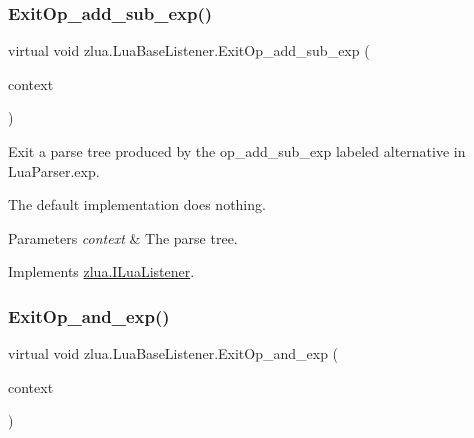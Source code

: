 \subsubsection{\texorpdfstring{Exit\+Op\+\_\+add\+\_\+sub\+\_\+exp()}{ExitOp\_add\_sub\_exp()}}
{\footnotesize\ttfamily virtual void zlua.\+Lua\+Base\+Listener.\+Exit\+Op\+\_\+add\+\_\+sub\+\_\+exp (\begin{DoxyParamCaption}\item[{\mbox{[}\+Not\+Null\mbox{]} \mbox{\hyperlink{classzlua_1_1_lua_parser_1_1_op__add__sub__exp_context}{Lua\+Parser.\+Op\+\_\+add\+\_\+sub\+\_\+exp\+Context}}}]{context }\end{DoxyParamCaption})\hspace{0.3cm}{\ttfamily [virtual]}}



Exit a parse tree produced by the {\ttfamily op\+\_\+add\+\_\+sub\+\_\+exp} labeled alternative in Lua\+Parser.\+exp. 

The default implementation does nothing.


\begin{DoxyParams}{Parameters}
{\em context} & The parse tree.\\
\hline
\end{DoxyParams}


Implements \mbox{\hyperlink{interfacezlua_1_1_i_lua_listener_a51e9a33e0c604e3a6151becd926a5852}{zlua.\+I\+Lua\+Listener}}.

\mbox{\label{classzlua_1_1_lua_base_listener_aceb367c135e67ca2d8c8372e57a4a2cb}} 
\subsubsection{\texorpdfstring{Exit\+Op\+\_\+and\+\_\+exp()}{ExitOp\_and\_exp()}}
{\footnotesize\ttfamily virtual void zlua.\+Lua\+Base\+Listener.\+Exit\+Op\+\_\+and\+\_\+exp (\begin{DoxyParamCaption}\item[{\mbox{[}\+Not\+Null\mbox{]} \mbox{\hyperlink{classzlua_1_1_lua_parser_1_1_op__and__exp_context}{Lua\+Parser.\+Op\+\_\+and\+\_\+exp\+Context}}}]{context }\end{DoxyParamCaption})\hspace{0.3cm}{\ttfamily [virtual]}}



